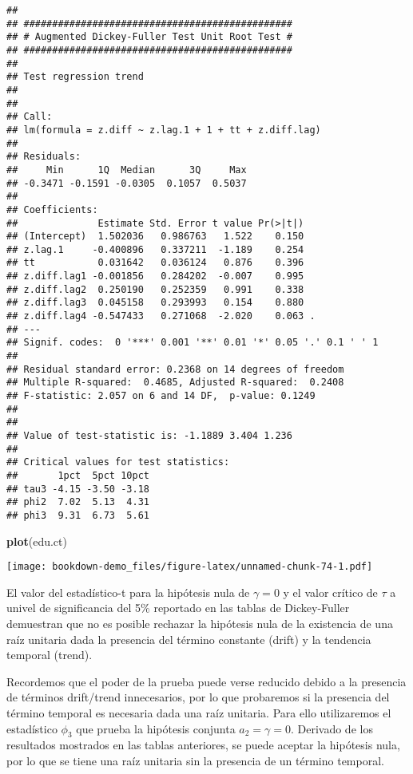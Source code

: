 \documentclass[]{book}
\newenvironment{Shaded}{\begin{snugshade}}{\end{snugshade}}
\newcommand{\KeywordTok}[1]{\textcolor[rgb]{0.13,0.29,0.53}{\textbf{#1}}}
\newcommand{\NormalTok}[1]{#1}
\theoremstyle{definition}
\theoremstyle{definition}
\theoremstyle{definition}
\theoremstyle{remark}
\begin{document}
\begin{verbatim}
## 
## ############################################### 
## # Augmented Dickey-Fuller Test Unit Root Test # 
## ############################################### 
## 
## Test regression trend 
## 
## 
## Call:
## lm(formula = z.diff ~ z.lag.1 + 1 + tt + z.diff.lag)
## 
## Residuals:
##     Min      1Q  Median      3Q     Max 
## -0.3471 -0.1591 -0.0305  0.1057  0.5037 
## 
## Coefficients:
##              Estimate Std. Error t value Pr(>|t|)  
## (Intercept)  1.502036   0.986763   1.522    0.150  
## z.lag.1     -0.400896   0.337211  -1.189    0.254  
## tt           0.031642   0.036124   0.876    0.396  
## z.diff.lag1 -0.001856   0.284202  -0.007    0.995  
## z.diff.lag2  0.250190   0.252359   0.991    0.338  
## z.diff.lag3  0.045158   0.293993   0.154    0.880  
## z.diff.lag4 -0.547433   0.271068  -2.020    0.063 .
## ---
## Signif. codes:  0 '***' 0.001 '**' 0.01 '*' 0.05 '.' 0.1 ' ' 1
## 
## Residual standard error: 0.2368 on 14 degrees of freedom
## Multiple R-squared:  0.4685, Adjusted R-squared:  0.2408 
## F-statistic: 2.057 on 6 and 14 DF,  p-value: 0.1249
## 
## 
## Value of test-statistic is: -1.1889 3.404 1.236 
## 
## Critical values for test statistics: 
##       1pct  5pct 10pct
## tau3 -4.15 -3.50 -3.18
## phi2  7.02  5.13  4.31
## phi3  9.31  6.73  5.61
\end{verbatim}

\begin{Shaded}
\begin{Highlighting}[]
\KeywordTok{plot}\NormalTok{(edu.ct)}
\end{Highlighting}
\end{Shaded}

\texttt{[image: bookdown-demo\_files/figure-latex/unnamed-chunk-74-1.pdf]}

El valor del estadístico-t para la hipótesis nula de \(\gamma=0\) y el
valor crítico de \(\tau\) a univel de significancia del 5\% reportado en
las tablas de Dickey-Fuller demuestran que no es posible rechazar la
hipótesis nula de la existencia de una raíz unitaria dada la presencia
del término constante (drift) y la tendencia temporal (trend).

Recordemos que el poder de la prueba puede verse reducido debido a la
presencia de términos drift/trend innecesarios, por lo que probaremos si
la presencia del término temporal es necesaria dada una raíz unitaria.
Para ello utilizaremos el estadístico \(\phi_3\) que prueba la hipótesis
conjunta \(a_2=\gamma=0\). Derivado de los resultados mostrados en las
tablas anteriores, se puede aceptar la hipótesis nula, por lo que se
tiene una raíz unitaria sin la presencia de un término temporal.
\end{document}

